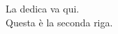 \begin{flushright}
	\null{}
	
		La dedica va qui.\\
		Questa è la seconda riga.
	
	\null
\end{flushright}
\newpage
